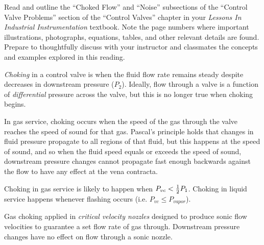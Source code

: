 

Read and outline the ``Choked Flow'' and ``Noise'' subsections of the ``Control Valve Problems'' section of the ``Control Valves'' chapter in your {\it Lessons In Industrial Instrumentation} textbook.  Note the page numbers where important illustrations, photographs, equations, tables, and other relevant details are found.  Prepare to thoughtfully discuss with your instructor and classmates the concepts and examples explored in this reading.














{\it Choking} in a control valve is when the fluid flow rate remains steady despite decreases in downstream pressure ($P_2$).  Ideally, flow through a valve is a function of {\it differential} pressure across the valve, but this is no longer true when choking begins.

\vskip 10pt

In gas service, choking occurs when the speed of the gas through the valve reaches the speed of sound for that gas.  Pascal's principle holds that changes in fluid pressure propagate to all regions of that fluid, but this happens at the speed of sound, and so when the fluid speed equals or exceeds the speed of sound, downstream pressure changes cannot propagate fast enough backwards against the flow to have any effect at the vena contracta.

\vskip 10pt

Choking in gas service is likely to happen when $P_{vc} < {1 \over 2} P_1$.  Choking in liquid service happens whenever flashing occurs (i.e. $P_{vc} \leq P_{vapor}$).

\vskip 10pt

Gas choking applied in {\it critical velocity nozzles} designed to produce sonic flow velocities to guarantee a set flow rate of gas through.  Downstream pressure changes have no effect on flow through a sonic nozzle.

\vskip 20pt

